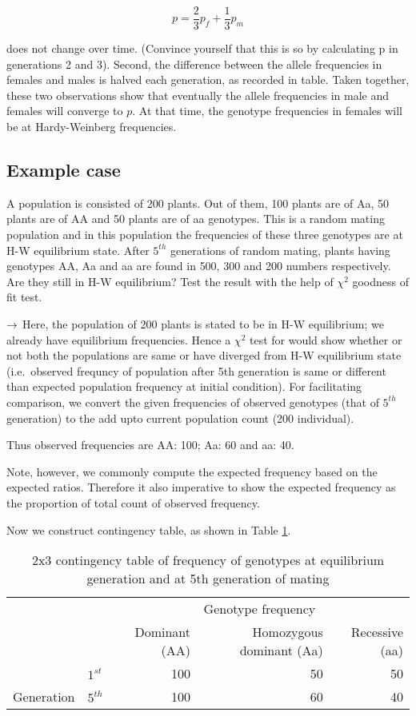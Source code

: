 \documentclass[nofonts,]{tufte-handout}
\begin{document}
\[
p = \frac{2}{3}p_f + \frac{1}{3}p_m
\]

does not change over time. (Convince yourself that this is so by
calculating p in generations 2 and 3). Second, the difference between
the allele frequencies in females and males is halved each generation,
as recorded in table. Taken together, these two observations show that
eventually the allele frequencies in male and females will converge to
\(p\). At that time, the genotype frequencies in females will be at
Hardy-Weinberg frequencies.

\hypertarget{example-case}{%
\subsection{Example case}\label{example-case}}

A population is consisted of 200 plants. Out of them, 100 plants are of
Aa, 50 plants are of AA and 50 plants are of aa genotypes. This is a
random mating population and in this population the frequencies of these
three genotypes are at H-W equilibrium state. After \(5^{th}\)
generations of random mating, plants having genotypes AA, Aa and aa are
found in 500, 300 and 200 numbers respectively. Are they still in H-W
equilibrium? Test the result with the help of \(\chi^2\) goodness of fit
test.

\(\Large \rightarrow\) Here, the population of 200 plants is stated to
be in H-W equilibrium; we already have equilibrium frequencies. Hence a
\(\chi^2\) test for would show whether or not both the populations are
same or have diverged from H-W equilibrium state (i.e.~observed frequncy
of population after 5th generation is same or different than expected
population frequency at initial condition). For facilitating comparison,
we convert the given frequencies of observed genotypes (that of
\(5^{th}\) generation) to the add upto current population count (200
individual).

Thus observed frequencies are AA: 100; Aa: 60 and aa: 40.

Note, however, we commonly compute the expected frequency based on the
expected ratios. Therefore it also imperative to show the expected
frequency as the proportion of total count of observed frequency.

Now we construct contingency table, as shown in Table
\ref{tab:hw-equilibrium-independence-chi}.

\begin{longtable}{llrrr}
\caption{\label{tab:hw-equilibrium-independence-chi}2x3 contingency table of frequency of genotypes at equilibrium generation and at 5th generation of mating}\\
\toprule
\multicolumn{2}{c}{  } & \multicolumn{3}{c}{Genotype frequency} \\
\cmidrule(l{3pt}r{3pt}){3-5}
  &   & Dominant (AA) & Homozygous dominant (Aa) & Recessive (aa)\\
\midrule
 & $1^{st}$ & 100 & 50 & 50\\
\cmidrule{2-5}
\multirow{-2}{*}{\raggedright\arraybackslash Generation} & $5^{th}$ & 100 & 60 & 40\\
\bottomrule
\end{longtable}
\end{document}
